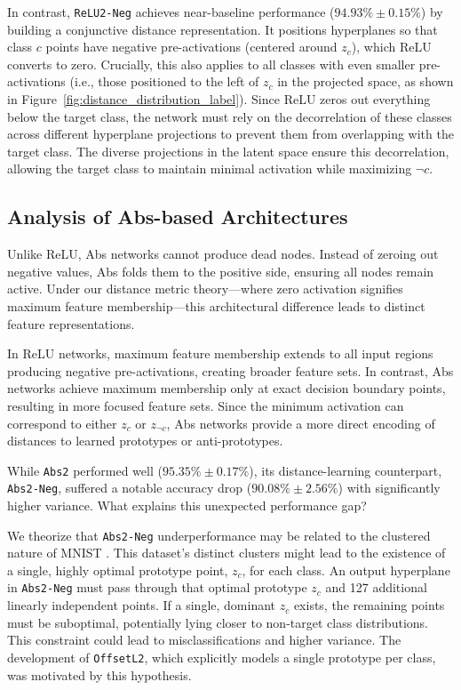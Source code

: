 In contrast, \texttt{ReLU2-Neg} achieves near-baseline performance ($94.93\% \pm 0.15\%$) by building a conjunctive distance representation. It positions hyperplanes so that class $c$ points have negative pre-activations (centered around $z_c$), which ReLU converts to zero. Crucially, this also applies to all classes with even smaller pre-activations (i.e., those positioned to the left of $z_c$ in the projected space, as shown in Figure~\ref{fig:distance_distribution_label}). Since ReLU zeros out everything below the target class, the network must rely on the decorrelation of these classes across different hyperplane projections to prevent them from overlapping with the target class. The diverse projections in the latent space \cite{bengio2013representation, cogswell2016decorrelating} ensure this decorrelation, allowing the target class to maintain minimal activation while maximizing $\neg c$.

\subsection{Analysis of Abs-based Architectures}

Unlike ReLU, Abs networks cannot produce dead nodes. Instead of zeroing out negative values, Abs folds them to the positive side, ensuring all nodes remain active. Under our distance metric theory—where zero activation signifies maximum feature membership—this architectural difference leads to distinct feature representations. 

In ReLU networks, maximum feature membership extends to all input regions producing negative pre-activations, creating broader feature sets. In contrast, Abs networks achieve maximum membership only at exact decision boundary points, resulting in more focused feature sets. Since the minimum activation can correspond to either $z_c$ or $z_{\neg c}$, Abs networks provide a more direct encoding of distances to learned prototypes or anti-prototypes.

While \texttt{Abs2} performed well ($95.35\% \pm 0.17\%$), its distance-learning counterpart, \texttt{Abs2-Neg}, suffered a notable accuracy drop ($90.08\% \pm 2.56\%$) with significantly higher variance. What explains this unexpected performance gap?

We theorize that \texttt{Abs2-Neg} underperformance may be related to the clustered nature of MNIST \cite{deng2012mnist, perez2017effectiveness}. This dataset's distinct clusters might lead to the existence of a single, highly optimal prototype point, $z_c$, for each class. An output hyperplane in \texttt{Abs2-Neg} must pass through that optimal prototype $z_c$ and 127 additional linearly independent points. If a single, dominant $z_c$ exists, the remaining points must be suboptimal, potentially lying closer to non-target class distributions. This constraint could lead to misclassifications and higher variance. The development of \texttt{OffsetL2}, which explicitly models a single prototype per class, was motivated by this hypothesis.

